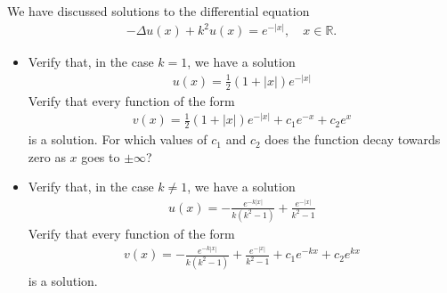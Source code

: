 \documentclass[11pt]{article}
\begin{document}
\begin{exercise}
    We have discussed solutions to the differential equation 
    \begin{align*}
        - \Delta u(x) + k^2 u(x) = e^{-|x|}, \quad x \in \mathbb R.
    \end{align*}
    \begin{itemize}
        \item 
        Verify that, in the case $k=1$, we have a solution 
        \begin{align*}
            u(x) = \frac 1 2 (1+|x|) e^{-|x|} 
        \end{align*}
        Verify that every function of the form 
        \begin{align*}
            v(x) = \frac 1 2 (1+|x|) e^{-|x|} + c_1 e^{-x} + c_2 e^{x} 
        \end{align*}
        is a solution. For which values of $c_1$ and $c_2$ does the function decay towards zero as $x$ goes to $\pm \infty$?
        \item 
        Verify that, in the case $k \neq 1$, we have a solution 
        \begin{align*}
            u(x) = - \frac{ e^{-k|x|} }{ k (k^2-1) } + \frac{ e^{-|x|} }{ k^2-1 }
        \end{align*}
        Verify that every function of the form 
        \begin{align*}
            v(x) = - \frac{ e^{-k|x|} }{ k (k^2-1) } + \frac{ e^{-|x|} }{ k^2-1 } + c_1 e^{-kx} + c_2 e^{kx} 
        \end{align*}        
        is a solution.
    \end{itemize}
\end{exercise}
\end{document}
